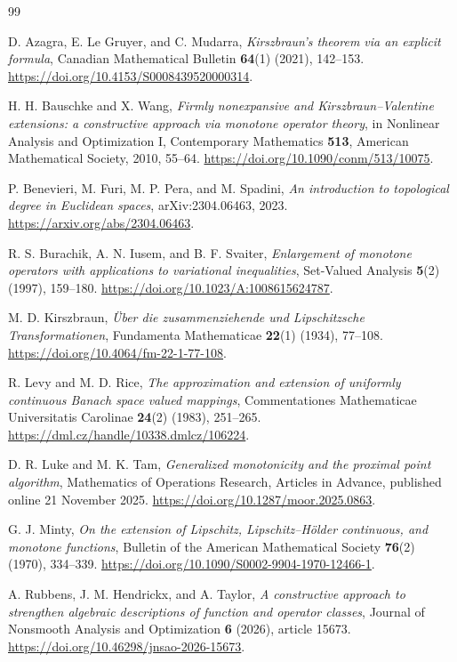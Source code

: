 \documentclass[11pt]{article}
\numberwithin{equation}{section}
\theoremstyle{definition}
\theoremstyle{remark}
\begin{document}
\begin{thebibliography}{99}

D. Azagra, E. Le Gruyer, and C. Mudarra,
\emph{Kirszbraun's theorem via an explicit formula},
Canadian Mathematical Bulletin \textbf{64}(1) (2021), 142--153.
\url{https://doi.org/10.4153/S0008439520000314}.

H. H. Bauschke and X. Wang,
\emph{Firmly nonexpansive and Kirszbraun--Valentine extensions: a
constructive approach via monotone operator theory},
in Nonlinear Analysis and Optimization I, Contemporary Mathematics
\textbf{513}, American Mathematical Society, 2010, 55--64.
\url{https://doi.org/10.1090/conm/513/10075}.

P. Benevieri, M. Furi, M. P. Pera, and M. Spadini,
\emph{An introduction to topological degree in Euclidean spaces},
arXiv:2304.06463, 2023. \url{https://arxiv.org/abs/2304.06463}.

R. S. Burachik, A. N. Iusem, and B. F. Svaiter,
\emph{Enlargement of monotone operators with applications to variational
inequalities}, Set-Valued Analysis \textbf{5}(2) (1997), 159--180.
\url{https://doi.org/10.1023/A:1008615624787}.

M. D. Kirszbraun,
\emph{\"Uber die zusammenziehende und Lipschitzsche Transformationen},
Fundamenta Mathematicae \textbf{22}(1) (1934), 77--108.
\url{https://doi.org/10.4064/fm-22-1-77-108}.

R. Levy and M. D. Rice,
\emph{The approximation and extension of uniformly continuous Banach
space valued mappings}, Commentationes Mathematicae Universitatis
Carolinae \textbf{24}(2) (1983), 251--265.
\url{https://dml.cz/handle/10338.dmlcz/106224}.

D. R. Luke and M. K. Tam,
\emph{Generalized monotonicity and the proximal point algorithm},
Mathematics of Operations Research, Articles in Advance,
published online 21 November 2025.
\url{https://doi.org/10.1287/moor.2025.0863}.

G. J. Minty,
\emph{On the extension of Lipschitz, Lipschitz--H\"older continuous,
and monotone functions}, Bulletin of the American Mathematical Society
\textbf{76}(2) (1970), 334--339.
\url{https://doi.org/10.1090/S0002-9904-1970-12466-1}.

A. Rubbens, J. M. Hendrickx, and A. Taylor,
\emph{A constructive approach to strengthen algebraic descriptions of
function and operator classes},
Journal of Nonsmooth Analysis and Optimization \textbf{6} (2026),
article 15673.
\url{https://doi.org/10.46298/jnsao-2026-15673}.


\end{thebibliography}
\end{document}
